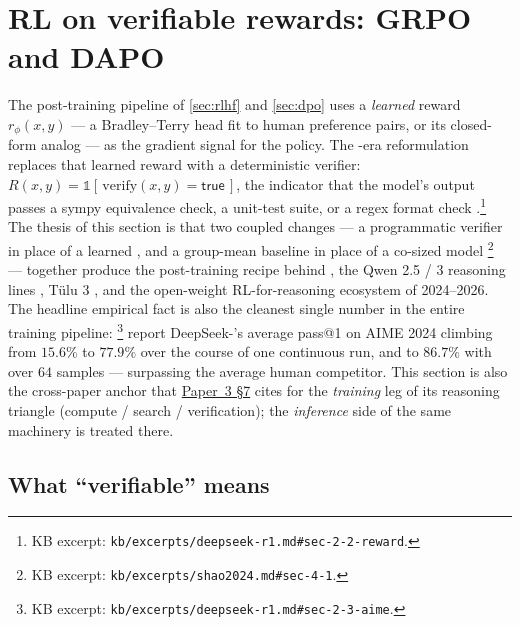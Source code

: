 
\section{RL on verifiable rewards: GRPO and DAPO}
\label{sec:rlvr-grpo}
\label{sec:rlvr-frontier}

The post-training pipeline of \cref{sec:rlhf} and \cref{sec:dpo} uses a
\emph{learned} reward $r_\phi(x, y)$ — a Bradley--Terry head fit to
human preference pairs, or its  closed-form analog — as the gradient
signal for the policy. The -era reformulation replaces that learned
reward with a deterministic verifier: $R(x, y) = \mathbb{1}[\,\mathrm{verify}(x, y) = \mathsf{true}\,]$,
the indicator that the model's output passes a sympy equivalence check,
a unit-test suite, or a regex format check
\citep[\S 2.2]{deepseek-r1}.\footnote{KB excerpt:
\nolinkurl{kb/excerpts/deepseek-r1.md#sec-2-2-reward}.} The thesis of this
section is that two coupled changes — a programmatic verifier in place
of a learned , and a group-mean baseline in place of a
co-sized  model \citep[\S 4.1]{shao2024}\footnote{KB excerpt:
\nolinkurl{kb/excerpts/shao2024.md#sec-4-1}.} — together produce the
post-training recipe behind \citet{deepseek-r1}, the Qwen 2.5 / 3
reasoning lines \citep{qwen3}, T\"ulu 3 \citep{tulu3}, and the
open-weight RL-for-reasoning ecosystem of 2024--2026. The headline
empirical fact is also the cleanest single number in the entire training
pipeline: \citet[\S 2.3]{deepseek-r1}\footnote{KB excerpt:
\nolinkurl{kb/excerpts/deepseek-r1.md#sec-2-3-aime}.} report
DeepSeek-'s average pass@1 on AIME 2024 climbing from
$15.6\%$ to $77.9\%$ over the course of one continuous  run, and to
$86.7\%$ with  over $64$ samples — surpassing the
average human competitor. This section is also the cross-paper anchor
that \hyperref[P3-sec:rlvr-grpo-dapo]{Paper~3 §7} cites for the \emph{training} leg of its reasoning
triangle (compute / search / verification); the \emph{inference} side of
the same machinery is treated there.

\subsection{What ``verifiable'' means}
\label{sec:rlvr-verifiable}

